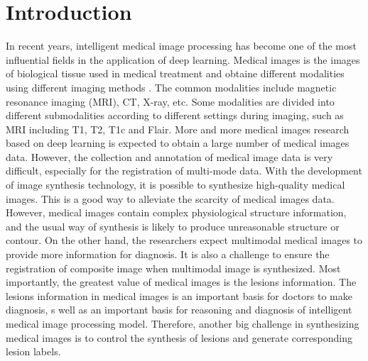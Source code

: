 \documentclass[runningheads]{llncs}
\begin{document}
	\section{Introduction}
	In recent years, intelligent medical image processing has become one of the most influential fields in the application of deep learning. Medical images is the images of biological tissue used in medical treatment and obtaine different modalities using different imaging methods . The common modalities include magnetic resonance imaging (MRI), CT, X-ray, etc. Some modalities are divided into different submodalities according to different settings during imaging, such as MRI including T1, T2, T1c and Flair.
	More and more medical images research based on deep learning is expected to obtain a large number of medical images data. However, the collection and annotation of medical image data is very difficult, especially for the registration of multi-mode data. With the development of image synthesis technology, it is possible to synthesize high-quality medical images. This is a good way to alleviate the scarcity of medical images data.
	However, medical images contain complex physiological structure information, and the usual way of synthesis is likely to produce unreasonable structure or contour. On the other hand, the researchers expect multimodal medical images to provide more information for diagnosis. It is also a challenge to ensure the registration of composite image when multimodal image is synthesized.
	Most importantly, the greatest value of medical images is the lesions information. The lesions information in medical images is an important basis for doctors to make diagnosis, s well as an important basis for reasoning and diagnosis of intelligent medical image processing model. Therefore, another big challenge in synthesizing medical images is to control the synthesis of lesions and generate corresponding lesion labels.
	
\end{document}

